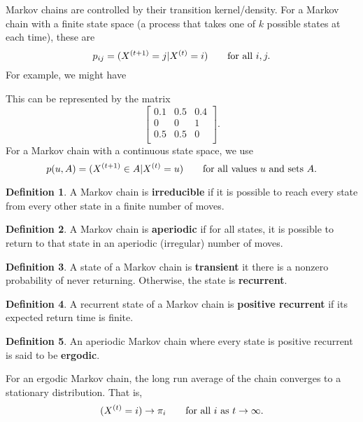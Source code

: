 \documentclass[article]{memoir}
\let\Pr\relax%
\DeclareMathOperator{\Pr}{\mathbb{P}}
\DeclareMathOperator{\1}{\mathbf{1}}
\theoremstyle{definition}
\newtheorem{defi}{Definition}[chapter]
\begin{document}
Markov chains are controlled by their transition kernel/density. For a Markov
chain with a finite state space (a process that takes one of $k$ possible
states at each time), these are
    \[
    p_{ij}
    =
    \Pr(X^{(t+1)} = j \vert X^{(t)} = i)
    \qquad\text{for all } i, j.
    \]
For example, we might have
    \begin{figure}[h!]
    \end{figure}
This can be represented by the matrix
    \[
    \begin{bmatrix}
    0.1 & 0.5 & 0.4 \\
    0 & 0 & 1 \\
    0.5 & 0.5 & 0 \\
    \end{bmatrix}.
    \]
For a Markov chain with a continuous state space, we use
    \[
    p(u, A)
    =
    \Pr(X^{(t+1)} \in A \vert X^{(t)} = u)
    \qquad\text{for all values } u \text{ and sets } A.
    \]

    \begin{defi}
    A Markov chain is \textbf{irreducible} if it is possible to reach every
    state from every other state in a finite number of moves.
    \end{defi}

    \begin{defi}
    A Markov chain is \textbf{aperiodic} if for all states, it is possible to
    return to that state in an aperiodic (irregular) number of moves.
    \end{defi}
    
    \begin{defi}
    A state of a Markov chain is \textbf{transient} it there is a nonzero
    probability of never returning. Otherwise, the state is 
    \textbf{recurrent}.
    \end{defi}

    \begin{defi}
    A recurrent state of a Markov chain is \textbf{positive recurrent} if its
    expected return time is finite.
    \end{defi}

    \begin{defi}
    An aperiodic Markov chain where every state is positive recurrent is said
    to be \textbf{ergodic}.
    \end{defi}

For an ergodic Markov chain, the long run average of the chain converges to
a stationary distribution. That is,
    \[
    \Pr(X^{(t)} = i) \to \pi_i
    \qquad\text{for all } i \text{ as } t \to \infty.
    \]
\end{document}
